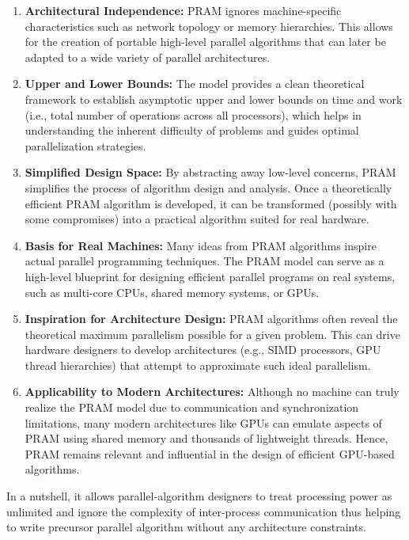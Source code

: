 \documentclass[12pt]{book}
\begin{document}
\begin{enumerate}
    \item \textbf{Architectural Independence:} PRAM ignores machine-specific characteristics such as network topology or memory hierarchies. This allows for the creation of portable high-level parallel algorithms that can later be adapted to a wide variety of parallel architectures.
    
    \item \textbf{Upper and Lower Bounds:} The model provides a clean theoretical framework to establish asymptotic upper and lower bounds on time and work (i.e., total number of operations across all processors), which helps in understanding the inherent difficulty of problems and guides optimal parallelization strategies.
    
    \item \textbf{Simplified Design Space:} By abstracting away low-level concerns, PRAM simplifies the process of algorithm design and analysis. Once a theoretically efficient PRAM algorithm is developed, it can be transformed (possibly with some compromises) into a practical algorithm suited for real hardware.
    
    \item \textbf{Basis for Real Machines:} Many ideas from PRAM algorithms inspire actual parallel programming techniques. The PRAM model can serve as a high-level blueprint for designing efficient parallel programs on real systems, such as multi-core CPUs, shared memory systems, or GPUs.
    
    \item \textbf{Inspiration for Architecture Design:} PRAM algorithms often reveal the theoretical maximum parallelism possible for a given problem. This can drive hardware designers to develop architectures (e.g., SIMD processors, GPU thread hierarchies) that attempt to approximate such ideal parallelism.
    
    \item \textbf{Applicability to Modern Architectures:} Although no machine can truly realize the PRAM model due to communication and synchronization limitations, many modern architectures like GPUs can emulate aspects of PRAM using shared memory and thousands of lightweight threads. Hence, PRAM remains relevant and influential in the design of efficient GPU-based algorithms.
\end{enumerate}
In a nutshell, it allows parallel-algorithm designers to treat processing power as unlimited and ignore the complexity of inter-process communication thus helping to write precursor parallel algorithm without any architecture constraints.
\end{document}
